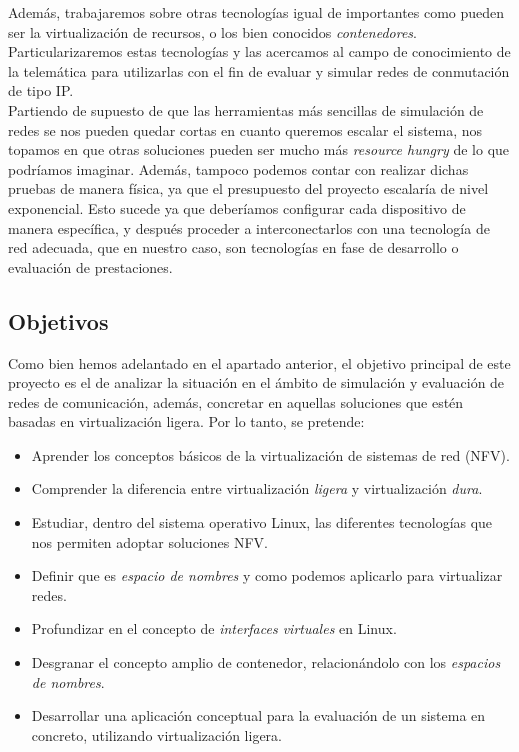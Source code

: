 \documentclass[12pt]{article}
\begin{document}
	 \noindent Además, trabajaremos sobre otras tecnologías igual de importantes como pueden ser la virtualización de recursos, o los bien conocidos \textit{contenedores}. Particularizaremos estas tecnologías y las acercamos al campo de conocimiento de la telemática para utilizarlas con el fin de evaluar y simular redes de conmutación de tipo IP. \\
	
	\noindent Partiendo de supuesto de que las herramientas más sencillas de simulación de redes se nos pueden quedar cortas en cuanto queremos escalar el sistema, nos topamos en que otras soluciones pueden ser mucho más \textit{resource hungry} de lo que podríamos imaginar. Además, tampoco podemos contar con realizar dichas pruebas de manera física, ya que el presupuesto del proyecto escalaría de nivel exponencial. Esto sucede ya que deberíamos configurar cada dispositivo de manera específica, y después proceder a interconectarlos con una tecnología de red adecuada, que en nuestro caso, son tecnologías en fase de desarrollo o evaluación de prestaciones.\\
	
	
	\pagebreak
	
	\subsection{Objetivos}
	\noindent Como bien hemos adelantado en el apartado anterior, el objetivo principal de este proyecto es el de analizar la situación en el ámbito de simulación y evaluación de redes de comunicación, además, concretar en aquellas soluciones que estén basadas en virtualización ligera. Por lo tanto, se pretende: 
	\begin{itemize}
		\item Aprender los conceptos básicos de la virtualización de sistemas de red (NFV).
		\item Comprender la diferencia entre virtualización \textit{ligera} y virtualización \textit{dura}.
		\item Estudiar, dentro del sistema operativo Linux, las diferentes tecnologías que nos permiten adoptar soluciones NFV.
		\item Definir que es \textit{espacio de nombres} y como podemos aplicarlo para virtualizar redes.
		\item Profundizar en el concepto de \textit{interfaces virtuales} en Linux.
		\item Desgranar el concepto amplio de contenedor, relacionándolo con los \textit{espacios de nombres}.
		\item Desarrollar una aplicación conceptual para la evaluación de un sistema en concreto, utilizando virtualización ligera.
	\end{itemize}
\end{document}
